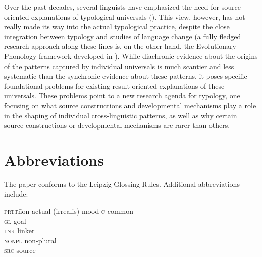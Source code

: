 \documentclass[output=paper]{langsci/langscibook}
\begin{document}
Over the past decades, several linguists have emphasized the need for
source-oriented explanations of typological universals (\citealt{Bybee1988_Diachr,Bybee2006_Univ,Bybee2008_StructPres,Aristar1991_Diachr,Gildea1998_Carib,Otareferential,Otacompetingmotivations,Otadependencies,Anderson2016_Change}). This
view, however, has not really made its way into the actual typological
practice, despite the close integration between typology and studies
of language change (a fully fledged research approach along these lines is, on
the other hand, the Evolutionary Phonology framework developed in
\citealt{Blevins2004}). While diachronic evidence about the origins
of the patterns captured by individual universals is much scantier and
less systematic than the synchronic evidence about these patterns, 
 it poses specific foundational problems for existing result-oriented explanations of these universals. These problems point to a
new research agenda for typology, one  focusing on what source constructions and developmental
mechanisms play a role in the shaping of individual cross-linguistic
patterns, as well as why certain source
constructions or developmental mechanisms are rarer than others.

\section*{Abbreviations}

The paper conforms to the Leipzig Glossing Rules. Additional abbreviations include:
\begin{multicols}{2}
\begin{tabbing}
\textsc{prtt}\hspace{5mm}\=non-actual (irrealis) mood\hspace{5mm}\kill
\textsc{c}  \>  common                 \\
\textsc{gl} \> goal                          \\
\textsc{lnk}   \>  linker                  \\
\textsc{nonpl} \>  non-plural \\
\textsc{src} \>  source \\
\end{tabbing}
\end{multicols}

\sloppy
\printbibliography[heading=subbibliography,notkeyword=this] 
\end{document}
